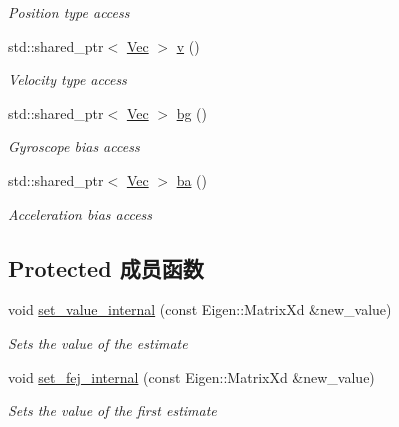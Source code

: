 \begin{DoxyCompactItemize}
\begin{DoxyCompactList}\small\item\em Position type access \end{DoxyCompactList}\item 
\mbox{\label{classov__type_1_1IMU_aacf93e0120b0b65e32d6163a7b0003ae}} 
std\+::shared\+\_\+ptr$<$ \hyperlink{classov__type_1_1Vec}{Vec} $>$ \hyperlink{classov__type_1_1IMU_aacf93e0120b0b65e32d6163a7b0003ae}{v} ()
\begin{DoxyCompactList}\small\item\em Velocity type access \end{DoxyCompactList}\item 
\mbox{\label{classov__type_1_1IMU_a197df0137b205d1de56e89633ffdb03e}} 
std\+::shared\+\_\+ptr$<$ \hyperlink{classov__type_1_1Vec}{Vec} $>$ \hyperlink{classov__type_1_1IMU_a197df0137b205d1de56e89633ffdb03e}{bg} ()
\begin{DoxyCompactList}\small\item\em Gyroscope bias access \end{DoxyCompactList}\item 
\mbox{\label{classov__type_1_1IMU_abed8b317325773478f1326ee82152eb9}} 
std\+::shared\+\_\+ptr$<$ \hyperlink{classov__type_1_1Vec}{Vec} $>$ \hyperlink{classov__type_1_1IMU_abed8b317325773478f1326ee82152eb9}{ba} ()
\begin{DoxyCompactList}\small\item\em Acceleration bias access \end{DoxyCompactList}\end{DoxyCompactItemize}
\subsection*{Protected 成员函数}
\begin{DoxyCompactItemize}
\item 
void \hyperlink{classov__type_1_1IMU_a044e09e82a734c3e0fe5f54748c40db6}{set\+\_\+value\+\_\+internal} (const Eigen\+::\+Matrix\+Xd \&new\+\_\+value)
\begin{DoxyCompactList}\small\item\em Sets the value of the estimate \end{DoxyCompactList}\item 
void \hyperlink{classov__type_1_1IMU_a5227146c3f4edef484cb2c9beb349a3f}{set\+\_\+fej\+\_\+internal} (const Eigen\+::\+Matrix\+Xd \&new\+\_\+value)
\begin{DoxyCompactList}\small\item\em Sets the value of the first estimate \end{DoxyCompactList}\end{DoxyCompactItemize}
